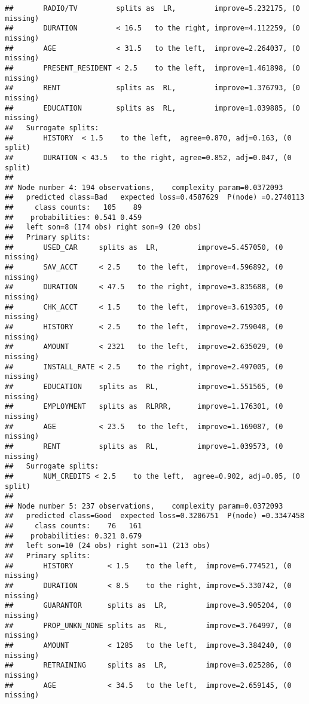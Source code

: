 \documentclass[
]{article}
\begin{document}
\begin{verbatim}
##       RADIO/TV         splits as  LR,         improve=5.232175, (0 missing)
##       DURATION         < 16.5   to the right, improve=4.112259, (0 missing)
##       AGE              < 31.5   to the left,  improve=2.264037, (0 missing)
##       PRESENT_RESIDENT < 2.5    to the left,  improve=1.461898, (0 missing)
##       RENT             splits as  RL,         improve=1.376793, (0 missing)
##       EDUCATION        splits as  RL,         improve=1.039885, (0 missing)
##   Surrogate splits:
##       HISTORY  < 1.5    to the left,  agree=0.870, adj=0.163, (0 split)
##       DURATION < 43.5   to the right, agree=0.852, adj=0.047, (0 split)
## 
## Node number 4: 194 observations,    complexity param=0.0372093
##   predicted class=Bad   expected loss=0.4587629  P(node) =0.2740113
##     class counts:   105    89
##    probabilities: 0.541 0.459 
##   left son=8 (174 obs) right son=9 (20 obs)
##   Primary splits:
##       USED_CAR     splits as  LR,         improve=5.457050, (0 missing)
##       SAV_ACCT     < 2.5    to the left,  improve=4.596892, (0 missing)
##       DURATION     < 47.5   to the right, improve=3.835688, (0 missing)
##       CHK_ACCT     < 1.5    to the left,  improve=3.619305, (0 missing)
##       HISTORY      < 2.5    to the left,  improve=2.759048, (0 missing)
##       AMOUNT       < 2321   to the left,  improve=2.635029, (0 missing)
##       INSTALL_RATE < 2.5    to the right, improve=2.497005, (0 missing)
##       EDUCATION    splits as  RL,         improve=1.551565, (0 missing)
##       EMPLOYMENT   splits as  RLRRR,      improve=1.176301, (0 missing)
##       AGE          < 23.5   to the left,  improve=1.169087, (0 missing)
##       RENT         splits as  RL,         improve=1.039573, (0 missing)
##   Surrogate splits:
##       NUM_CREDITS < 2.5    to the left,  agree=0.902, adj=0.05, (0 split)
## 
## Node number 5: 237 observations,    complexity param=0.0372093
##   predicted class=Good  expected loss=0.3206751  P(node) =0.3347458
##     class counts:    76   161
##    probabilities: 0.321 0.679 
##   left son=10 (24 obs) right son=11 (213 obs)
##   Primary splits:
##       HISTORY        < 1.5    to the left,  improve=6.774521, (0 missing)
##       DURATION       < 8.5    to the right, improve=5.330742, (0 missing)
##       GUARANTOR      splits as  LR,         improve=3.905204, (0 missing)
##       PROP_UNKN_NONE splits as  RL,         improve=3.764997, (0 missing)
##       AMOUNT         < 1285   to the left,  improve=3.384240, (0 missing)
##       RETRAINING     splits as  LR,         improve=3.025286, (0 missing)
##       AGE            < 34.5   to the left,  improve=2.659145, (0 missing)

\end{verbatim}
\end{document}
